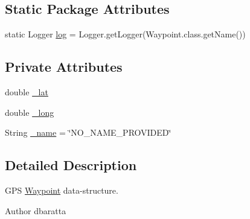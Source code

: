 \subsection*{Static Package Attributes}
\begin{DoxyCompactItemize}
\item 
static Logger \hyperlink{classrob_o_s2_1_1gps_1_1_waypoint_a294f2a97d0c2ab20acb4de448a72753c}{log} = Logger.getLogger(Waypoint.class.getName())
\end{DoxyCompactItemize}
\subsection*{Private Attributes}
\begin{DoxyCompactItemize}
\item 
double \hyperlink{classrob_o_s2_1_1gps_1_1_waypoint_aa71f1baadde6afe8aa751fc8470b5875}{\_\-lat}
\item 
double \hyperlink{classrob_o_s2_1_1gps_1_1_waypoint_a1a1d6cacf8516f9f06ecd48b2c467180}{\_\-long}
\item 
String \hyperlink{classrob_o_s2_1_1gps_1_1_waypoint_a9858d8ec37deed55a6456eba501591c8}{\_\-name} = \char`\"{}NO\_\-NAME\_\-PROVIDED\char`\"{}
\end{DoxyCompactItemize}


\subsection{Detailed Description}
GPS \hyperlink{classrob_o_s2_1_1gps_1_1_waypoint}{Waypoint} data-\/structure.

\begin{DoxyAuthor}{Author}
dbaratta 
\end{DoxyAuthor}


